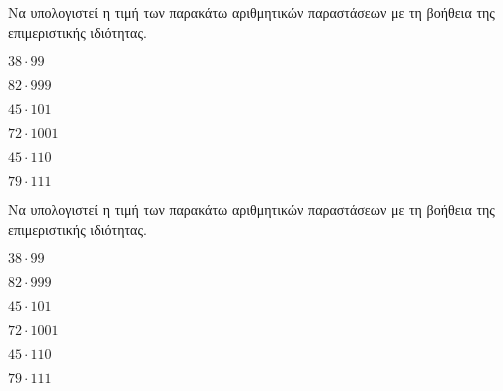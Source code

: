Να υπολογιστεί η τιμή των παρακάτω αριθμητικών παραστάσεων με τη βοήθεια της επιμεριστικής ιδιότητας.
\begin{multicols}{3}
\begin{rlist}
\item $ 38\cdot99 $
\item $ 82\cdot999 $
\item $ 45\cdot101 $
\item $ 72\cdot1001 $
\item $ 45\cdot110 $
\item $ 79\cdot111 $
\end{rlist}
\end{multicols}
Να υπολογιστεί η τιμή των παρακάτω αριθμητικών παραστάσεων με τη βοήθεια της επιμεριστικής ιδιότητας.
\begin{multicols}{3}
\begin{rlist}
\item $ 38\cdot99 $
\item $ 82\cdot999 $
\item $ 45\cdot101 $
\item $ 72\cdot1001 $
\item $ 45\cdot110 $
\item $ 79\cdot111 $
\end{rlist}
\end{multicols}
